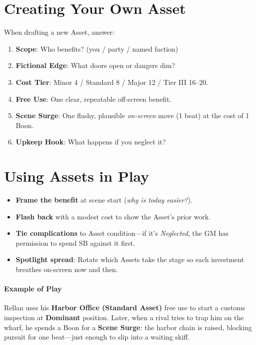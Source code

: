 \section{Creating Your Own Asset}
\label{sec:creating-your-own-asset}
When drafting a new Asset, answer:
\begin{enumerate}
  \item \textbf{Scope}: Who benefits? (you / party / named faction)
  \item \textbf{Fictional Edge}: What doors open or dangers dim?
  \item \textbf{Cost Tier}: Minor 4 / Standard 8 / Major 12 / Tier III 16--20.
  \item \textbf{Free Use}: One clear, repeatable off-screen benefit.
  \item \textbf{Scene Surge}: One flashy, plausible \emph{on-screen} move (1 beat) at the cost of 1 Boon.
  \item \textbf{Upkeep Hook}: What happens if you neglect it?
\end{enumerate}

\section{Using Assets in Play}
\begin{itemize}
  \item \textbf{Frame the benefit} at scene start (\emph{why is today easier?}).
  \item \textbf{Flash back} with a modest cost to show the Asset's prior work.
  \item \textbf{Tie complications} to Asset condition---if it's \emph{Neglected}, the GM has permission to spend SB against it first.
  \item \textbf{Spotlight spread}: Rotate which Assets take the stage so each investment breathes on-screen now and then.
\end{itemize}

\paragraph{Example of Play}
Rellan uses his \textbf{Harbor Office (Standard Asset)} free use to start a customs inspection at \textbf{Dominant} position. Later, when a rival tries to trap him on the wharf, he spends a Boon for a \textbf{Scene Surge}: the harbor chain is raised, blocking pursuit for one beat---just enough to slip into a waiting skiff.

